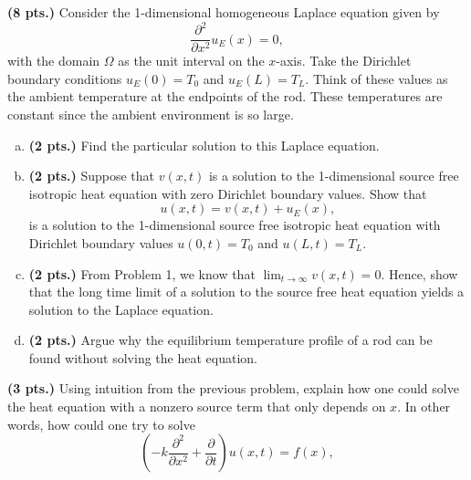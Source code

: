 \documentclass[12pt]{article} %
\begin{document}
\begin{problem}
    \textbf{(8 pts.)} Consider the 1-dimensional homogeneous Laplace equation given by 
    \[
    \frac{\partial^2}{\partial x^2} u_E(x) = 0,
    \]
    with the domain $\Omega$ as the unit interval on the $x$-axis.  Take the Dirichlet boundary conditions $u_E(0)=T_0$ and $u_E(L)=T_L$.  Think of these values as the ambient temperature at the endpoints of the rod.  These temperatures are constant since the ambient environment is so large.
    \begin{enumerate}[(a)]
        \item \textbf{(2 pts.)} Find the particular solution to this Laplace equation.
        \item \textbf{(2 pts.)} Suppose that $v(x,t)$ is a solution to the 1-dimensional source free isotropic heat equation with zero Dirichlet boundary values. Show that 
        \[
        u(x,t)=v(x,t)+u_E(x),
        \]  
        is a solution to the 1-dimensional source free isotropic heat equation with Dirichlet boundary values $u(0,t)=T_0$ and $u(L,t)=T_L$.
        \item \textbf{(2 pts.)} From Problem 1, we know that $\lim_{t\to \infty} v(x,t) = 0$.  Hence, show that the long time limit of a solution to the source free heat equation yields a solution to the Laplace equation.
        \item \textbf{(2 pts.)} Argue why the equilibrium temperature profile of a rod can be found without solving the heat equation.
    \end{enumerate}
\end{problem}

\begin{problem}
    \textbf{(3 pts.)} Using intuition from the previous problem, explain how one could solve the heat equation with a nonzero source term that only depends on $x$. In other words, how could one try to solve
    \[
    \left( -k \frac{\partial^2}{\partial x^2} + \frac{\partial}{\partial t} \right) u(x,t) = f(x),
    \]
\end{problem}
\end{document}
